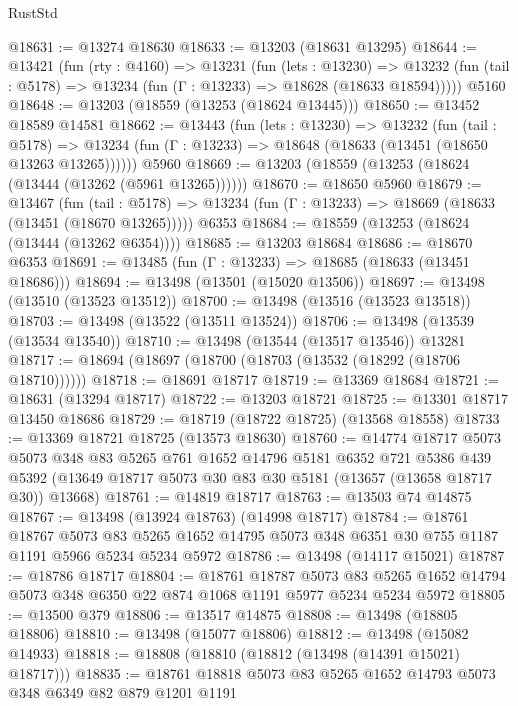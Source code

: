 \begin{lexlean}{RustStd}
\begin{coremodule}
@18631 := @13274 @18630
@18633 := @13203 (@18631 @13295)
@18644 := @13421
    (fun (rty : @4160) =>
    @13231
      (fun (lets : @13230) =>
      @13232 (fun (tail : @5178) => @13234 (fun (Γ : @13233) => @18628 (@18633 @18594)))))
    @5160
@18648 := @13203 (@18559 (@13253 (@18624 @13445)))
@18650 := @13452 @18589 @14581
@18662 := @13443
    (fun (lets : @13230) =>
    @13232
      (fun (tail : @5178) =>
      @13234 (fun (Γ : @13233) => @18648 (@18633 (@13451 (@18650 @13263 @13265))))))
    @5960
@18669 := @13203 (@18559 (@13253 (@18624 (@13444 (@13262 (@5961 @13265))))))
@18670 := @18650 @5960
@18679 := @13467
    (fun (tail : @5178) => @13234 (fun (Γ : @13233) => @18669 (@18633 (@13451 (@18670 @13265)))))
    @6353
@18684 := @18559 (@13253 (@18624 (@13444 (@13262 @6354))))
@18685 := @13203 @18684
@18686 := @18670 @6353
@18691 := @13485 (fun (Γ : @13233) => @18685 (@18633 (@13451 @18686)))
@18694 := @13498 (@13501 (@15020 @13506))
@18697 := @13498 (@13510 (@13523 @13512))
@18700 := @13498 (@13516 (@13523 @13518))
@18703 := @13498 (@13522 (@13511 @13524))
@18706 := @13498 (@13539 (@13534 @13540))
@18710 := @13498 (@13544 (@13517 @13546)) @13281
@18717 := @18694 (@18697 (@18700 (@18703 (@13532 (@18292 (@18706 @18710))))))
@18718 := @18691 @18717
@18719 := @13369 @18684
@18721 := @18631 (@13294 @18717)
@18722 := @13203 @18721
@18725 := @13301 @18717 @13450 @18686
@18729 := @18719 (@18722 @18725) (@13568 @18558)
@18733 := @13369 @18721 @18725 (@13573 @18630)
@18760 := @14774
    @18717
    @5073
    @5073
    @348
    @83
    @5265
    @761
    @1652
    @14796
    @5181
    @6352
    @721
    @5386
    @439
    @5392
    (@13649 @18717 @5073 @30 @83 @30 @5181 (@13657 (@13658 @18717 @30)) @13668)
@18761 := @14819 @18717
@18763 := @13503 @74 @14875
@18767 := @13498 (@13924 @18763) (@14998 @18717)
@18784 := @18761
    @18767
    @5073
    @83
    @5265
    @1652
    @14795
    @5073
    @348
    @6351
    @30
    @755
    @1187
    @1191
    @5966
    @5234
    @5234
    @5972
@18786 := @13498 (@14117 @15021)
@18787 := @18786 @18717
@18804 := @18761
    @18787
    @5073
    @83
    @5265
    @1652
    @14794
    @5073
    @348
    @6350
    @22
    @874
    @1068
    @1191
    @5977
    @5234
    @5234
    @5972
@18805 := @13500 @379
@18806 := @13517 @14875
@18808 := @13498 (@18805 @18806)
@18810 := @13498 (@15077 @18806)
@18812 := @13498 (@15082 @14933)
@18818 := @18808 (@18810 (@18812 (@13498 (@14391 @15021) @18717)))
@18835 := @18761
    @18818
    @5073
    @83
    @5265
    @1652
    @14793
    @5073
    @348
    @6349
    @82
    @879
    @1201
    @1191

\end{coremodule}
\end{lexlean}
